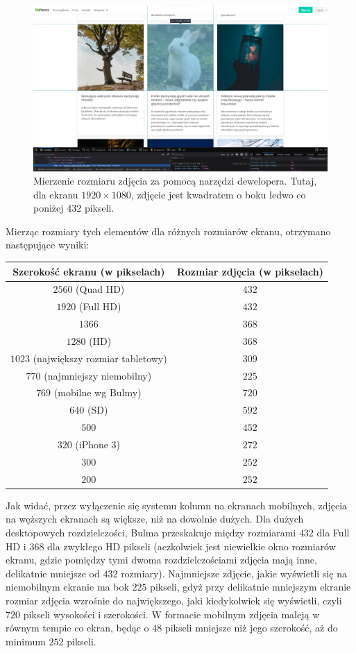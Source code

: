 \documentclass[licencjacka]{pracadypl}
\begin{document}
\begin{figure}[H]
  \includegraphics[width=\linewidth]{images/screenshot-devtools-1080width.png}
  \caption{Mierzenie rozmiaru zdjęcia za pomocą narzędzi dewelopera. Tutaj, dla ekranu $1920\times1080$, zdjęcie jest kwadratem o boku ledwo co poniżej $432$ pikseli.}
  \label{fig:screenshot-measuring}
\end{figure}

Mierząc rozmiary tych elementów dla różnych rozmiarów ekranu, otrzymano następujące wyniki:

\begin{center}
  \begin{tabular}{|c|c|}
    \hline
    Szerokość ekranu (w pikselach) & Rozmiar zdjęcia (w pikselach) \\
    \hline
    $2560$ (Quad HD) & $432$ \\
    $1920$ (Full HD) & $432$ \\
    $1366$ & $368$ \\
    $1280$ (HD) & $368$ \\
    $1023$ (największy rozmiar tabletowy) & $309$ \\
    $770$ (najmniejszy niemobilny) & $225$ \\
    $769$ (mobilne wg Bulmy) & $720$ \\
    $640$ (SD) & $592$ \\
    $500$ & $452$ \\
    $320$ (iPhone 3) & $272$ \\
    $300$ & $252$ \\
    $200$ & $252$ \\
    \hline
  \end{tabular}
\end{center}

Jak widać, przez wyłączenie się systemu kolumn na ekranach mobilnych, zdjęcia na węższych ekranach są większe, niż na dowolnie dużych. Dla dużych desktopowych rozdzielczości, Bulma przeskakuje między rozmiarami $432$ dla Full HD i $368$ dla zwykłego HD pikseli (aczkolwiek jest niewielkie okno rozmiarów ekranu, gdzie pomiędzy tymi dwoma rozdzielczościami zdjęcia mają inne, delikatnie mniejsze od $432$ rozmiary). Najmniejsze zdjęcie, jakie wyświetli się na niemobilnym ekranie ma bok $225$ pikseli, gdyż przy delikatnie mniejszym ekranie rozmiar zdjęcia wzrośnie do największego, jaki kiedykolwiek się wyświetli, czyli $720$ pikseli wysokości i szerokości. W formacie mobilnym zdjęcia maleją w równym tempie co ekran, będąc o $48$ pikseli mniejsze niż jego szerokość, aż do minimum $252$ pikseli.
\end{document}
